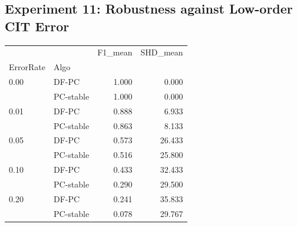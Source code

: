 \subsection*{Experiment 11: Robustness against Low-order CIT Error}
\begin{tabular}{llrr}
\toprule
     &           &  F1\_mean &  SHD\_mean \\
ErrorRate & Algo &          &           \\
\midrule
0.00 & DF-PC &    1.000 &     0.000 \\
     & PC-stable &    1.000 &     0.000 \\
0.01 & DF-PC &    0.888 &     6.933 \\
     & PC-stable &    0.863 &     8.133 \\
0.05 & DF-PC &    0.573 &    26.433 \\
     & PC-stable &    0.516 &    25.800 \\
0.10 & DF-PC &    0.433 &    32.433 \\
     & PC-stable &    0.290 &    29.500 \\
0.20 & DF-PC &    0.241 &    35.833 \\
     & PC-stable &    0.078 &    29.767 \\
\bottomrule
\end{tabular}


